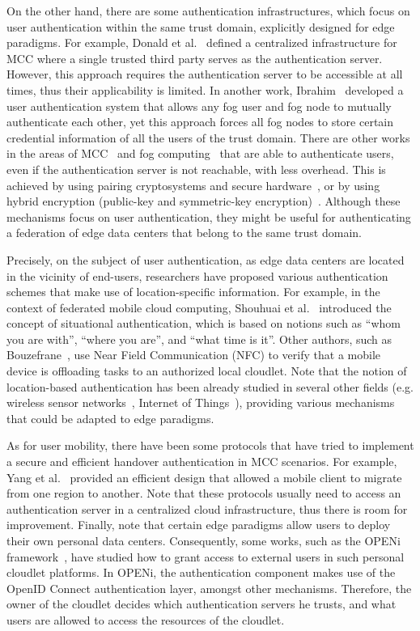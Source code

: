 \documentclass[twocolumn,preprint,3p]{elsarticle}
\begin{document}
On the other hand, there are some authentication infrastructures, which focus on user authentication within the same trust domain, explicitly designed for edge paradigms. For example, Donald et al.~\cite{Donald15} defined a centralized infrastructure for MCC where a single trusted third party serves as the authentication server. However, this approach requires the authentication server to be accessible at all times, thus their applicability is limited. In another work, Ibrahim~\cite{Ibrahim16} developed a user authentication system that allows any fog user and fog node to mutually authenticate each other, yet this approach forces all fog nodes to store certain credential information of all the users of the trust domain. There are other works in the areas of MCC~\cite{Tsai15} and fog computing~\cite{StojmenovicFSec05} that are able to authenticate users, even if the authentication server is not reachable, with less overhead. This is achieved by using pairing cryptosystems and secure hardware~\cite{Tsai15}, or by using hybrid encryption (public-key and symmetric-key encryption)~\cite{StojmenovicFSec05}. Although these mechanisms focus on user authentication, they might be useful for authenticating a federation of edge data centers that belong to the same trust domain.

Precisely, on the subject of user authentication, as edge data centers are located in the vicinity of end-users, researchers have proposed various authentication schemes that make use of location-specific information. For example, in the context of federated mobile cloud computing, Shouhuai et al.~\cite{Shouhuai16} introduced the concept of situational authentication, which is based on notions such as ``whom you are with'', ``where you are'', and ``what time is it''. Other authors, such as Bouzefrane~\cite{Bouzefrane14}, use Near Field Communication (NFC) to verify that a mobile device is offloading tasks to an authorized local cloudlet. Note that the notion of location-based authentication has been already studied in several other fields (e.g. wireless sensor networks~\cite{Zeng2010}, Internet of Things~\cite{Habib15}), providing various mechanisms that could be adapted to edge paradigms.

As for user mobility, there have been some protocols that have tried to implement a secure and efficient handover authentication in MCC scenarios. For example, Yang et al.~\cite{Yang2015Hand} provided an efficient design that allowed a mobile client to migrate from one region to another. Note that these protocols usually need to access an authentication server in a centralized cloud infrastructure, thus there is room for improvement. Finally, note that certain edge paradigms allow users to deploy their own personal data centers. Consequently, some works, such as the OPENi framework~\cite{McCarthy15}, have studied how to grant access to external users in such personal cloudlet platforms. In OPENi, the authentication component makes use of the OpenID Connect authentication layer, amongst other mechanisms. Therefore, the owner of the cloudlet decides which authentication servers he trusts, and what users are allowed to access the resources of the cloudlet.
\end{document}
